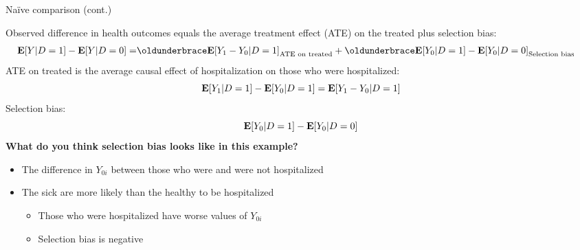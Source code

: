 \documentclass[handout, 8pt]{beamer}
\begin{document}
\begin{frame}{Na{\"i}ve comparison (cont.)}

Observed difference in health outcomes equals the average treatment effect (ATE) on the treated plus selection bias:
\begin{align*}
\EE [Y \vert D = 1] - \EE [Y \vert D=0] 
=& \underbrace{\EE [Y_1 - Y_0 \vert D = 1]}_{\text{ATE on treated}} 
+ \underbrace{\EE [Y_0 \vert D = 1] - \EE [Y_0 \vert D=0]}_{\text{Selection bias}}
\end{align*}
ATE on treated is the average causal effect of hospitalization on those who were hospitalized:
\begin{equation*}
    \mathbf{E} [Y_1 \vert D=1] - \mathbf{E} [Y_0 \vert D = 1] = \mathbf{E} [Y_1 - Y_0 \vert D = 1]
\end{equation*}
Selection bias:
\begin{equation*}
    \mathbf{E} [Y_0 \vert D = 1] - \mathbf{E} [Y_0 \vert D=0]
\end{equation*}
\textbf{What do you think selection bias looks like in this example?}

\pause
\begin{itemize}
    \item The difference in $Y_{0i}$ between those who were and were not hospitalized
    \item The sick are more likely than the healthy to be hospitalized
    \begin{itemize}
        \item[$\implies$] Those who were hospitalized have worse values of $Y_{0i}$

        \item[$\implies$] Selection bias is negative
    \end{itemize}
\end{itemize}
\end{frame}
\end{document}
